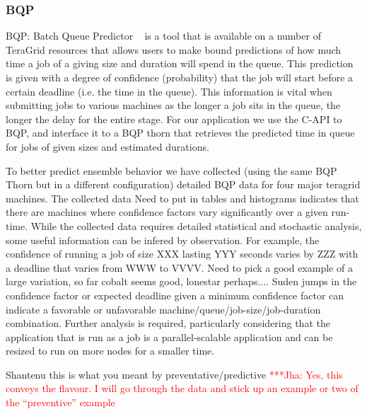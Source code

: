 \documentclass[conference,final]{IEEEtran}
\newcommand{\yaakoub}[0]{}
\newcommand{\jhanote}[1]{ {\textcolor{red} { ***Jha: #1 }}}
\begin{document}
\subsubsection{BQP}
BQP: Batch Queue Predictor ~\cite{bqp} is a tool that is available
on a number of TeraGrid resources that allows users to make bound predictions of
how much time a job of a giving size and duration will spend in the queue.
This prediction is given with a degree of confidence (probability)
that the job will start before a certain deadline (i.e. the time in the queue).
This information is vital when submitting jobs to various machines
as the longer a job sits in the queue, the longer the delay for the entire stage.
For our application we use the C-API to BQP, and interface it to a BQP thorn that
retrieves the predicted time in queue for jobs of given sizes and estimated durations.

To better predict ensemble behavior we have collected (using the same
BQP Thorn but in a different configuration) detailed BQP data for four
major teragrid machines. The collected data \yaakoub{Need to put in
  tables and histograms} indicates that there are machines where
confidence factors vary significantly over a given run-time. While the
collected data requires detailed statistical and stochastic analysis,
some useful information can be infered by observation. For example,
the confidence of running a job of size XXX lasting YYY seconds varies
by ZZZ with a deadline that varies from WWW to VVVV.  \yaakoub{Need to
  pick a good example of a large variation, so far cobalt seems good,
  lonestar perhaps....}  Suden jumps in the confidence factor or
expected deadline given a minimum confidence factor can indicate a
favorable or unfavorable machine/queue/job-size/job-duration
combination. Further analysis is required, particularly considering
that the application that is run as a job is a parallel-scalable
application and can be resized to run on more nodes for a smaller
time.

\yaakoub{Shantenu this is what you meant by preventative/predictive}
\jhanote{Yes, this conveys the flavour. I will go through the
data and stick up an example or two of the ``preventive'' example}

\end{document}
